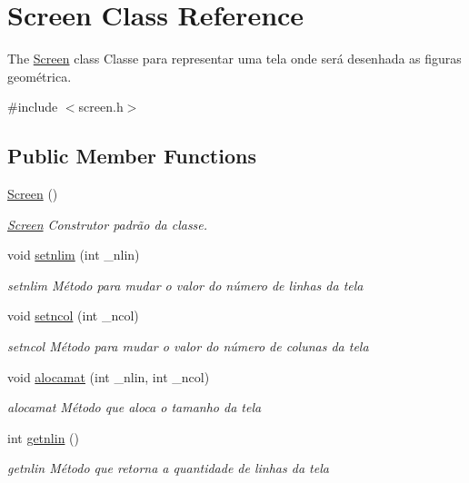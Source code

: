 \hypertarget{class_screen}{}\section{Screen Class Reference}
\label{class_screen}


The \mbox{\hyperlink{class_screen}{Screen}} class Classe para representar uma tela onde será desenhada as figuras geométrica.  




{\ttfamily \#include $<$screen.\+h$>$}

\subsection*{Public Member Functions}
\begin{DoxyCompactItemize}
\item 
\mbox{\hyperlink{class_screen_ae7576476fc6e6a6eaa66389fdc41fe72}{Screen}} ()
\begin{DoxyCompactList}\small\item\em \mbox{\hyperlink{class_screen}{Screen}} Construtor padrão da classe. \end{DoxyCompactList}\item 
void \mbox{\hyperlink{class_screen_ac4d187efda643cfc9127230d6363c721}{setnlim}} (int \+\_\+nlin)
\begin{DoxyCompactList}\small\item\em setnlim Método para mudar o valor do número de linhas da tela \end{DoxyCompactList}\item 
void \mbox{\hyperlink{class_screen_a07a26006fcf8b8169af511f1eff03a04}{setncol}} (int \+\_\+ncol)
\begin{DoxyCompactList}\small\item\em setncol Método para mudar o valor do número de colunas da tela \end{DoxyCompactList}\item 
void \mbox{\hyperlink{class_screen_a3570e45d7dbc261cc4da471259a66d7a}{alocamat}} (int \+\_\+nlin, int \+\_\+ncol)
\begin{DoxyCompactList}\small\item\em alocamat Método que aloca o tamanho da tela \end{DoxyCompactList}\item 
int \mbox{\hyperlink{class_screen_ac247e58a4575bbafa46b9f9d24841538}{getnlin}} ()
\begin{DoxyCompactList}\small\item\em getnlin Método que retorna a quantidade de linhas da tela \end{DoxyCompactList}\item 

\end{DoxyCompactItemize}
